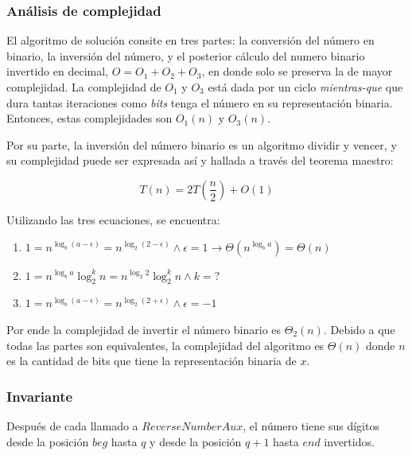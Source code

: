 \documentclass[letter]{article}
\begin{document}
\subsubsection{Análisis de complejidad} \label{algoritmos:dividir:complejidad}

El algoritmo de solución consite en tres partes: la conversión del número en  binario, la inversión del número, y el posterior cálculo del numero binario invertido en decimal, $O=O_1+O_2+O_3$, en donde solo se preserva la de mayor complejidad. La complejidad de $O_1$ y $O_3$ está dada por un ciclo {\it mientras-que} que dura tantas iteraciones como {\it bits} tenga el número en su representación binaria. Entonces, estas complejidades son $O_1(n)$ y $O_3(n)$. \par

Por su parte, la inversión del número binario es un algoritmo dividir y vencer, y su complejidad puede ser expresada así y hallada a través del teorema maestro: \par

\[ T(n) = 2T(\frac{n}{2}) + O(1) \]

Utilizando las tres ecuaciones, se encuentra:

\begin{enumerate}
    \item $1 = n^{\log_b(a-\epsilon)} = n^{\log_2(2-\epsilon)} \land \epsilon = 1 \rightarrow \Theta(n^{\log_b a}) = \Theta(n)$
    \item $1 = n^{\log_ba} \log_2^kn = n^{\log_2 2} \log_2^kn \land k = ?$
    \item $1 = n^{\log_b(a-\epsilon)} = n^{\log_2(2+\epsilon)} \land \epsilon = -1$
\end{enumerate}

Por ende la complejidad de invertir el número binario es $\Theta_2(n)$. Debido a que todas las partes son equivalentes, la complejidad del algoritmo es $\Theta(n)$ donde $n$ es la cantidad de bits que tiene la representación binaria de $x$. \par

\subsubsection{Invariante} \label{algoritmos:dividir:invariante}

Después de cada llamado a $ReverseNumberAux$, el número tiene sus dígitos desde la posición $beg$ hasta $q$ y desde la posición $q+1$ hasta $end$ invertidos. \par
\end{document}
